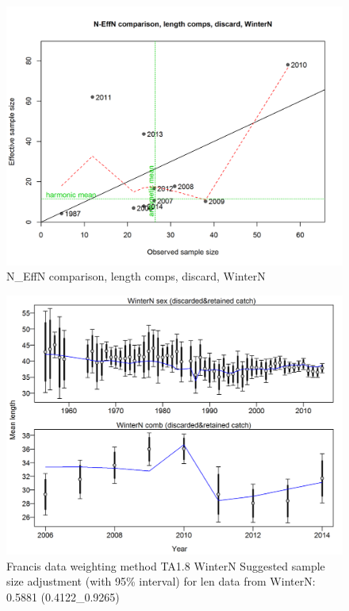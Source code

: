\documentclass[12pt,]{article}
\begin{document}
\begin{figure}[htbp]
\centering
\includegraphics{./r4ss/plots_mod1/comp_lenfit_sampsize_flt1mkt1.png}
\caption{N\_EffN comparison, length comps, discard, WinterN
\label{fig:mod1_8_comp_lenfit_sampsize_flt1mkt1}}
\end{figure}

\begin{figure}[htbp]
\centering
\includegraphics{./r4ss/plots_mod1/comp_lenfit_data_weighting_TA1.8_WinterN.png}
\caption{Francis data weighting method TA1.8 WinterN Suggested sample
size adjustment (with 95\% interval) for len data from WinterN: 0.5881
(0.4122\_0.9265)
\label{fig:mod1_9_comp_lenfit_data_weighting_TA1.8_WinterN}}
\end{figure}
\end{document}
